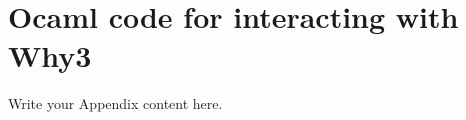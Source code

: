 \chapter{Ocaml code for interacting with Why3} %

\thispagestyle{nohead}

\label{AppendixB} %

Write your Appendix content here.